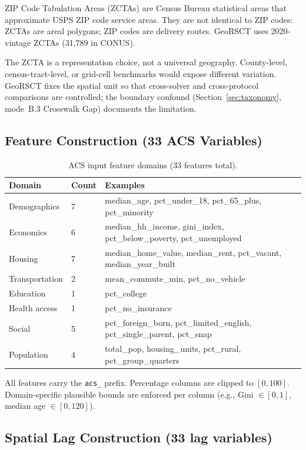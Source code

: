 \documentclass{article}
\begin{document}
ZIP Code Tabulation Areas (ZCTAs) are Census Bureau statistical areas that approximate USPS ZIP code service areas. They are not identical to ZIP codes: ZCTAs are areal polygons; ZIP codes are delivery routes. GeoRSCT uses 2020-vintage ZCTAs (31,789 in CONUS).

The ZCTA is a representation choice, not a universal geography. County-level, census-tract-level, or grid-cell benchmarks would expose different variation. GeoRSCT fixes the spatial unit so that cross-solver and cross-protocol comparisons are controlled; the boundary confound (Section~\ref{sec:taxonomy}, mode~B.3 Crosswalk Gap) documents the limitation.

\subsection{Feature Construction (33 ACS Variables)}

\begin{table}[htbp]
\centering
\small
\caption{ACS input feature domains (33 features total).}
\label{tab:acs_domains}
\begin{tabular}{lll}
\toprule
\textbf{Domain} & \textbf{Count} & \textbf{Examples} \\
\midrule
Demographics & 7 & median\_age, pct\_under\_18, pct\_65\_plus, pct\_minority \\
Economics & 6 & median\_hh\_income, gini\_index, pct\_below\_poverty, pct\_unemployed \\
Housing & 7 & median\_home\_value, median\_rent, pct\_vacant, median\_year\_built \\
Transportation & 2 & mean\_commute\_min, pct\_no\_vehicle \\
Education & 1 & pct\_college \\
Health access & 1 & pct\_no\_insurance \\
Social & 5 & pct\_foreign\_born, pct\_limited\_english, pct\_single\_parent, pct\_snap \\
Population & 4 & total\_pop, housing\_units, pct\_rural, pct\_group\_quarters \\
\bottomrule
\end{tabular}
\end{table}

All features carry the \texttt{acs\_} prefix. Percentage columns are clipped to $[0, 100]$. Domain-specific plausible bounds are enforced per column (e.g., Gini $\in [0,1]$, median age $\in [0, 120]$).

\subsection{Spatial Lag Construction (33 lag variables)}
\end{document}
